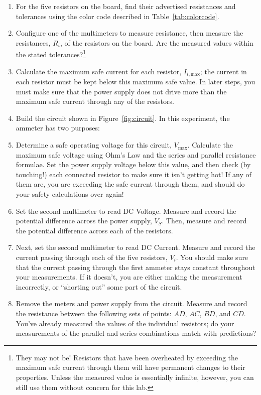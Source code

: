\documentclass[12pt]{article}
\begin{document}
\begin{enumerate}
\item For the five resistors on the board, find their advertised
  resistances and tolerances using the color code described in
  Table~\ref{tab:colorcode}.
\item Configure one of the multimeters to measure resistance, then
  measure the resistances, $R_i$, of the resistors on the board.  Are
  the measured values within the stated tolerances?\footnote{They may
    not be!  Resistors that have been overheated by exceeding the
    maximum safe current through them will have permanent changes to
    their properties.  Unless the measured value is essentially
    infinite, however, you can still use them without concern for this
    lab.}
\item Calculate the maximum safe current for each resistor,
  $I_{i,\mathrm{max}}$; the current in each resistor must be kept
  below this maximum safe value.  In later steps, you must make sure
  that the power supply does not drive more than the maximum safe
  current through any of the resistors.
\item Build the circuit shown in Figure~\ref{fig:circuit}.  In this
  experiment, the ammeter has two purposes:
\item Determine a safe operating voltage for this circuit,
  $V_\text{max}$.  Calculate the maximum safe voltage using Ohm's Law
  and the series and parallel resistance formulae.  Set the power
  supply voltage below this value, and then check (by touching!) each
  connected resistor to make sure it isn't getting hot!  If any of
  them are, you are exceeding the safe current through them, and
  should do your safety calculations over again!
\item Set the second multimeter to read DC Voltage.  Measure and
  record the potential difference across the power supply, $V_S$.  Then,
  measure and record the potential difference across each of the
  resistors.
\item Next, set the second multimeter to read DC Current.  Measure and
  record the current passing through each of the five resistors,
  $V_i$.  You should make sure that the current passing through the
  first ammeter stays constant throughout your measurements.  If it
  doesn't, you are either making the measurement incorrectly, or
  ``shorting out'' some part of the circuit.
\item Remove the meters and power supply from the circuit.  Measure
  and record the resistance between the following sets of points:
  $AD$, $AC$, $BD$, and $CD$.  You've already measured the values of
  the individual resistors; do your measurements of the parallel and
  series combinations match with predictions?
\end{enumerate}
\end{document}
